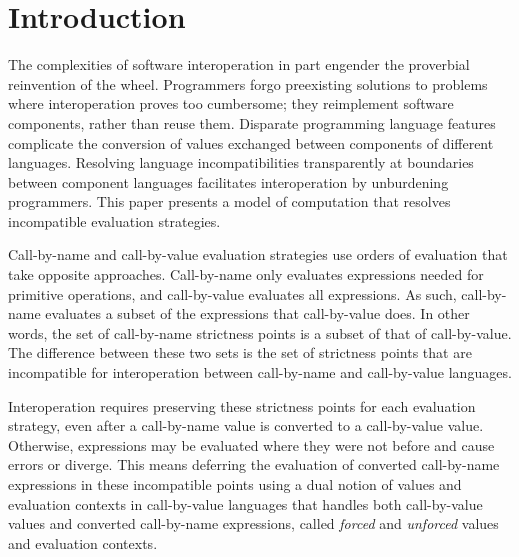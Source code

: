 \section{Introduction}

The complexities of software interoperation in part engender the proverbial reinvention of the wheel. Programmers forgo preexisting solutions to problems where interoperation proves too cumbersome; they reimplement software components, rather than reuse them. Disparate programming language features complicate the conversion of values exchanged between components of different languages. Resolving language incompatibilities transparently at boundaries between component languages facilitates interoperation by unburdening programmers. This paper presents a model of computation that resolves incompatible evaluation strategies.

Call-by-name and call-by-value evaluation strategies use orders of evaluation that take opposite approaches. Call-by-name only evaluates expressions needed for primitive operations, and call-by-value evaluates all expressions. As such, call-by-name evaluates a subset of the expressions that call-by-value does. In other words, the set of call-by-name strictness points is a subset of that of call-by-value. The difference between these two sets is the set of strictness points that are incompatible for interoperation between call-by-name and call-by-value languages.

Interoperation requires preserving these strictness points for each evaluation strategy, even after a call-by-name value is converted to a call-by-value value. Otherwise, expressions may be evaluated where they were not before and cause errors or diverge. This means deferring the evaluation of converted call-by-name expressions in these incompatible points using a dual notion of values and evaluation contexts in call-by-value languages that handles both call-by-value values and converted call-by-name expressions, called \emph{forced} and \emph{unforced} values and evaluation contexts.